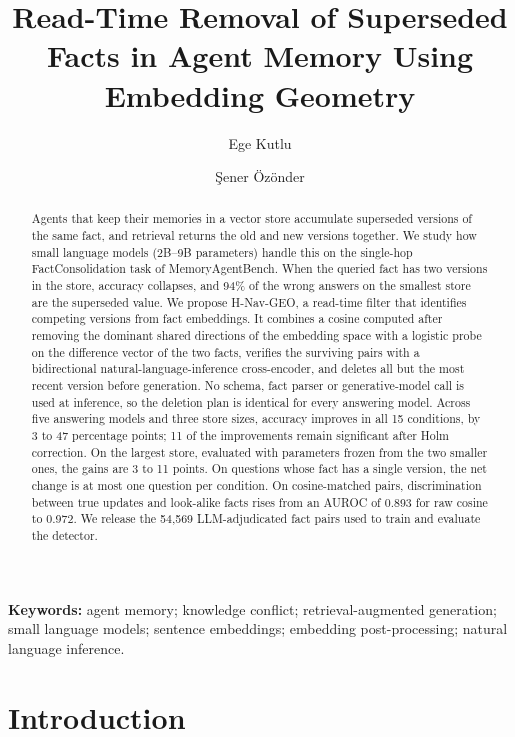 \documentclass[journal=jcisd8,manuscript=article]{achemso}
\title{Read-Time Removal of Superseded Facts in Agent Memory Using Embedding Geometry}
\author{Ege Kutlu}
\affiliation{Institute for Data Science \& Artificial Intelligence, Bo\u{g}azi\c{c}i University, \.{I}stanbul, T\"{u}rkiye}
\author{\c{S}ener \"Oz\"onder}
\affiliation{Institute for Data Science \& Artificial Intelligence, Bo\u{g}azi\c{c}i University, \.{I}stanbul, T\"{u}rkiye}
\newcommand{\geo}{H-Nav-GEO}
\begin{document}
\captionsetup[figure]{font=footnotesize}
\captionsetup[table]{font=footnotesize}

\maketitle

\begin{abstract}
Agents that keep their memories in a vector store accumulate superseded versions of the same fact, and retrieval returns the old and new versions together. We study how small language models (2B--9B parameters) handle this on the single-hop FactConsolidation task of MemoryAgentBench. When the queried fact has two versions in the store, accuracy collapses, and 94\% of the wrong answers on the smallest store are the superseded value. We propose \geo{}, a read-time filter that identifies competing versions from fact embeddings. It combines a cosine computed after removing the dominant shared directions of the embedding space with a logistic probe on the difference vector of the two facts, verifies the surviving pairs with a bidirectional natural-language-inference cross-encoder, and deletes all but the most recent version before generation. No schema, fact parser or generative-model call is used at inference, so the deletion plan is identical for every answering model. Across five answering models and three store sizes, accuracy improves in all 15 conditions, by 3 to 47 percentage points; 11 of the improvements remain significant after Holm correction. On the largest store, evaluated with parameters frozen from the two smaller ones, the gains are 3 to 11 points. On questions whose fact has a single version, the net change is at most one question per condition. On cosine-matched pairs, discrimination between true updates and look-alike facts rises from an AUROC of 0.893 for raw cosine to 0.972. We release the 54,569 LLM-adjudicated fact pairs used to train and evaluate the detector.
\end{abstract}

\noindent\textbf{Keywords:} agent memory; knowledge conflict; retrieval-augmented generation; small language models; sentence embeddings; embedding post-processing; natural language inference.

\section{Introduction}
\label{sec:intro}
\end{document}
